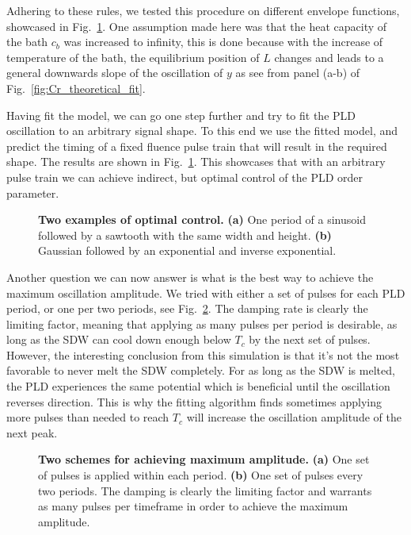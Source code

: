 Adhering to these rules, we tested this procedure on different envelope functions, showcased in Fig.~\ref{fig:Cr_control}.
One assumption made here was that the heat capacity of the bath $c_b$ was increased to infinity, this is done because with the increase of temperature of the bath, the equilibrium position of $L$ changes and leads to a general downwards slope of the oscillation of $y$ as see from panel (a-b) of Fig.~\ref{fig:Cr_theoretical_fit}.

Having fit the model, we can go one step further and try to fit the PLD oscillation to an arbitrary signal shape. To this end we use the fitted model, and predict the timing of a fixed fluence pulse train that will result in the required shape. The results are shown in Fig.~\ref{fig:Cr_control}. This showcases that with an arbitrary pulse train we can achieve indirect, but optimal control of the PLD order parameter.
\begin{figure}
	\caption{\label{fig:Cr_control} {\bf Two examples of optimal control.} {\bf (a)} One period of a sinusoid followed by a sawtooth with the same width and height. {\bf (b)} Gaussian followed by an exponential and inverse exponential.}
\end{figure}
Another question we can now answer is what is the best way to achieve the maximum oscillation amplitude.
We tried with either a set of pulses for each PLD period, or one per two periods, see Fig.~\ref{fig:Cr_maximum_amp}.
The damping rate is clearly the limiting factor, meaning that applying as many pulses per period is desirable, as long as the SDW can cool down enough below $T_c$ by the next set of pulses.
However, the interesting conclusion from this simulation is that it's not the most favorable to never melt the SDW completely.
For as long as the SDW is melted, the PLD experiences the same potential which is beneficial until the oscillation reverses direction.
This is why the fitting algorithm finds sometimes applying more pulses than needed to reach $T_c$ will increase the oscillation amplitude of the next peak.
\begin{figure}
	\caption{\label{fig:Cr_maximum_amp} {\bf Two schemes for achieving maximum amplitude.} {\bf (a)} One set of pulses is applied within each period. {\bf (b)} One set of pulses every two periods. The damping is clearly the limiting factor and warrants as many pulses per timeframe in order to achieve the maximum amplitude.}
\end{figure}

